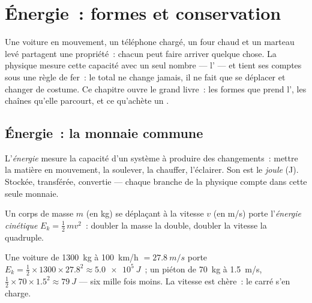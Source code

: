 \chapter{Énergie~: formes et conservation}\label{ch:g10:energy-conservation}

Une voiture en mouvement, un téléphone chargé, un four chaud et un
marteau levé partagent une propriété~: chacun peut faire arriver quelque
chose. La physique mesure cette capacité avec un seul nombre ---
l' --- et tient ses comptes sous une règle de fer~: le
total ne change jamais, il ne fait que se déplacer et changer de
costume. Ce chapitre ouvre le grand livre~: les formes que prend
l', les chaînes qu'elle parcourt, et ce qu'achète un
.

\section{Énergie~: la monnaie commune}

\begin{definition}\label{def:g10:energy-conservation:energy}
L'\emph{énergie} mesure la capacité d'un système à
produire des changements~: mettre la matière en mouvement, la soulever,
la chauffer, l'éclairer. Son  est le
\emph{joule} (\unit{J}). Stockée, transférée, convertie ---
chaque branche de la physique compte dans cette seule monnaie.
\end{definition}

\begin{definition}\label{def:g10:energy-conservation:kinetic}
Un corps de masse $m$ (en \unit{kg}) se déplaçant à la vitesse $v$ (en
\unit{m/s}) porte l'\emph{énergie cinétique}
$E_k = \tfrac12\, m v^2$~: doubler la masse la double, doubler la
vitesse la quadruple.
\end{definition}

\begin{example}\label{ex:g10:energy-conservation:kinetic}
Une voiture de \qty{1300}{kg} à \qty{100}{km/h} $= \qty{27.8}{m/s}$
porte $E_k = \tfrac12 \times 1300 \times 27.8^2 \approx \qty{5.0e5}{J}$~;
un piéton de \qty{70}{kg} à \qty{1.5}{m/s},
$\tfrac12 \times 70 \times 1.5^2 \approx \qty{79}{J}$ --- six mille
fois moins. La vitesse est chère~: le carré s'en charge.
\end{example}

